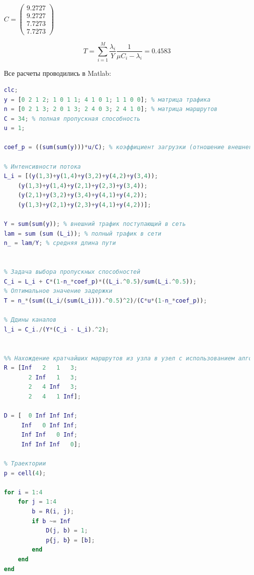\documentclass[14pt,a4paper,report]{report}
\begin{document}
$C = \begin{pmatrix} 
9.2727 \\
9.2727 \\
7.7273 \\
7.7273
\end{pmatrix}
\quad$



$$ T = \sum_{i=1}^M \frac{\lambda_i}{Y} \frac{1}{\mu C_i-\lambda_i }=0.4583  $$















Все расчеты проводились в Matlab:
\begin{lstlisting}[language={matlab}, caption={Скрипт}, basicstyle=\ttfamily]
clc;
y = [0 2 1 2; 1 0 1 1; 4 1 0 1; 1 1 0 0]; % матрица трафика
n = [0 2 1 3; 2 0 1 3; 2 4 0 3; 2 4 1 0]; % матрица маршрутов
C = 34; % полная пропускная способность
u = 1;

coef_p = ((sum(sum(y)))*u/C); % коэффициент загрузки (отношение внешнего траффика в битах от суммарной пропускной способности)

% Интенсивности потока
L_i = [(y(1,3)+y(1,4)+y(3,2)+y(4,2)+y(3,4));
    (y(1,3)+y(1,4)+y(2,1)+y(2,3)+y(3,4));
    (y(2,1)+y(3,2)+y(3,4)+y(4,1)+y(4,2));
    (y(1,3)+y(2,1)+y(2,3)+y(4,1)+y(4,2))];

Y = sum(sum(y)); % внешний трафик поступающий в сеть
lam = sum (sum (L_i)); % полный трафик в сети
n_ = lam/Y; % средняя длина пути


% Задача выбора пропускных способностей
C_i = L_i + C*(1-n_*coef_p)*((L_i.^0.5)/sum(L_i.^0.5));
% Оптимальное значение задержки
T = n_*(sum((L_i/(sum(L_i))).^0.5)^2)/(C*u*(1-n_*coef_p));

% Ддины каналов
l_i = C_i./(Y*(C_i - L_i).^2);


%% Нахождение кратчайших маршрутов из узла в узел с использованием алгоритма Флойда
R = [Inf   2   1   3;
       2 Inf   1   3;
       2   4 Inf   3;
       2   4   1 Inf];
   
D = [  0 Inf Inf Inf;
     Inf   0 Inf Inf;
     Inf Inf   0 Inf;
     Inf Inf Inf   0];
 
% Траектории 
p = cell(4);

for i = 1:4
    for j = 1:4
        b = R(i, j);
        if b ~= Inf
            D(j, b) = 1;
            p{j, b} = [b];
        end
    end 
end


\end{lstlisting}
\end{document}
